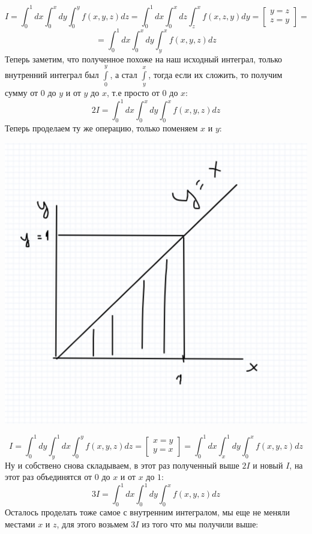 \documentclass[a4paper,12pt]{article}
\begin{document}
\[
I = 
\int_0^1 dx \int_0^x dy \int_0^y f(x, y, z) dz  = \int_0^1 dx \int_0^x dz \int_z^x f(x, z, y) dy  =
\begin{bmatrix}  y = z \\ z = y \end{bmatrix}
=
\]
\[
=
 \int_0^1 dx \int_0^x dy \int_y^x f(x, y, z) dz
\]
Теперь заметим, что полученное похоже на наш исходный интеграл, только внутренний интеграл был $\int\limits_0^y$, а стал $\int\limits_y^x$, тогда если их сложить, то получим сумму от 0 до $y$ и от $y$ до $x$, т.е просто от $0$ до $x$:
\[
2I = \int_0^1 dx \int_0^x dy \int_0^x f(x, y, z) dz  \]
Теперь проделаем ту же операцию, только поменяем $x$ и $y$:
\begin{center}
\includegraphics[scale=0.2]{4.png}
\end{center}
\[
I = \int_0^1 dy \int_y^1 dx \int_0^y f(x, y, z) dz = \begin{bmatrix}
x = y \\y = x
\end{bmatrix} = \int_0^1 dx \int_x^1 dy \int_0^x f(x, y, z) dz
\]
Ну и собствено снова складываем, в этот раз полученный выше $2I$ и новый $I$, на этот раз объединятся от $0$ до $x$ и от $x$ до $1$:
\[
3I = \int_0^1 dx \int_0^1 dy \int_0^x f(x, y, z) dz 
\]
Осталось проделать тоже самое с внутренним интегралом, мы еще не меняли местами $x$ и $z$, для этого возьмем $3I$ из того что мы получили выше:
\end{document}

